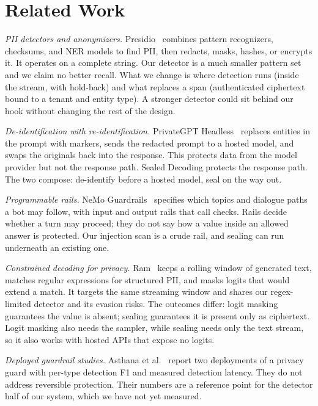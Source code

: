 \documentclass[conference,compsoc]{IEEEtran}
\begin{document}
\section{Related Work}
\label{sec:related}

\textit{PII detectors and anonymizers.} Presidio~\cite{presidio} combines pattern recognizers, checksums, and NER models to find PII, then redacts, masks, hashes, or encrypts it. It operates on a complete string. Our detector is a much smaller pattern set and we claim no better recall. What we change is where detection runs (inside the stream, with hold-back) and what replaces a span (authenticated ciphertext bound to a tenant and entity type). A stronger detector could sit behind our hook without changing the rest of the design.

\textit{De-identification with re-identification.} PrivateGPT Headless~\cite{privategpt} replaces entities in the prompt with markers, sends the redacted prompt to a hosted model, and swaps the originals back into the response. This protects data from the model provider but not the response path. Sealed Decoding protects the response path. The two compose: de-identify before a hosted model, seal on the way out.

\textit{Programmable rails.} NeMo Guardrails~\cite{rebedea2023nemo} specifies which topics and dialogue paths a bot may follow, with input and output rails that call checks. Rails decide whether a turn may proceed; they do not say how a value inside an allowed answer is protected. Our injection scan is a crude rail, and sealing can run underneath an existing one.

\textit{Constrained decoding for privacy.} Ram~\cite{ram2025constrained} keeps a rolling window of generated text, matches regular expressions for structured PII, and masks logits that would extend a match. It targets the same streaming window and shares our regex-limited detector and its evasion risks. The outcomes differ: logit masking guarantees the value is absent; sealing guarantees it is present only as ciphertext. Logit masking also needs the sampler, while sealing needs only the text stream, so it also works with hosted APIs that expose no logits.

\textit{Deployed guardrail studies.} Asthana et al.~\cite{asthana2025deploying} report two deployments of a privacy guard with per-type detection F1 and measured detection latency. They do not address reversible protection. Their numbers are a reference point for the detector half of our system, which we have not yet measured.
\end{document}
